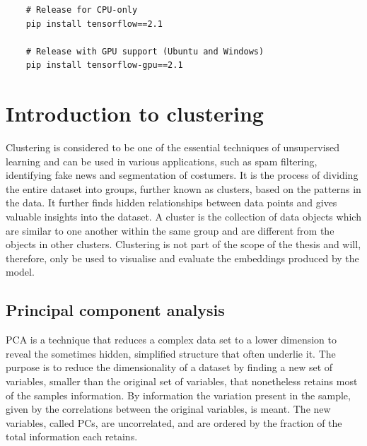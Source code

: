 \begin{verbatim}
    # Release for CPU-only
    pip install tensorflow==2.1
    
    # Release with GPU support (Ubuntu and Windows)
    pip install tensorflow-gpu==2.1 
\end{verbatim}

\section{Introduction to clustering}
\label{sec:Intro-Clustering}
Clustering is considered to be one of the essential techniques of unsupervised learning and can be used in various applications, such as spam filtering, identifying fake news and segmentation of costumers. 
\newline
\newline
It is the process of dividing the entire dataset into groups, further known as clusters, based on the patterns in the data. It further finds hidden relationships between data points and gives valuable insights into the dataset. A cluster is the collection of data objects which are similar to one another within the same group and are different from the objects in other clusters.
\newline
\newline
Clustering is not part of the scope of the thesis and will, therefore, only be used to visualise and evaluate the embeddings produced by the model.

\subsection{Principal component analysis}
\label{sub:PCA}
\Gls{PCA} is a technique that reduces a complex data set to a lower dimension to reveal the sometimes hidden, simplified structure that often underlie it. The purpose is to reduce the dimensionality of a dataset by finding a new set of variables, smaller than the original set of variables, that nonetheless retains most of the samples information. By information the variation present in the sample, given by the correlations between the original variables, is meant. The new variables, called \glspl{PC}, are uncorrelated, and are ordered by the fraction of the total information each retains.

